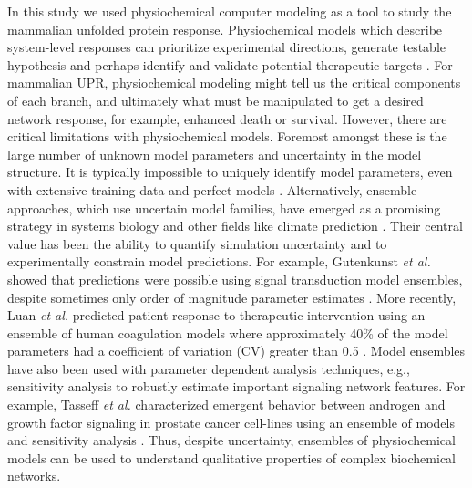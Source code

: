 \documentclass[fleqn,10pt]{wlscirep}
\begin{document}
In this study we used physiochemical computer modeling as a tool to study the mammalian unfolded protein response. Physiochemical models which describe system-level responses can prioritize experimental directions, generate testable hypothesis and perhaps identify and validate potential therapeutic targets \cite{KITANO2007}. For mammalian UPR, physiochemical modeling might tell us the critical components of each branch, and ultimately what must be manipulated to get a desired network response, for example, enhanced death or survival. However, there are critical limitations with physiochemical models. Foremost amongst these is the large number of unknown model parameters and uncertainty in the model structure. It is typically impossible to uniquely identify model parameters, even with extensive training data and perfect models \cite{Gadkar:2005ad}. Alternatively, ensemble approaches, which use uncertain model families, have emerged as a promising strategy in systems biology and other fields like climate prediction \cite{Battogtokh:2002uq,Kuepfer:2007,Brown:2003qy,Palmer:2005,Song:2009uq}. Their central value has been the ability to quantify simulation uncertainty and to experimentally constrain model predictions. For example, Gutenkunst \emph{et al.} showed that predictions were possible using signal transduction model ensembles, despite sometimes only order of magnitude parameter estimates \cite{Gutenkunst:2007oq}. More recently, Luan \emph{et al.} predicted patient response to therapeutic intervention using an ensemble of human coagulation models where approximately 40\% of the model parameters had a coefficient of variation (CV) greater than 0.5 \cite{Luan:2010fc}. Model ensembles have also been used with parameter dependent analysis techniques, e.g., sensitivity analysis to robustly estimate important signaling network features. For example, Tasseff \emph{et al.} characterized emergent behavior between androgen and growth factor signaling in prostate cancer cell-lines using an ensemble of models and sensitivity analysis \cite{Tasseff:2010rq}. Thus, despite uncertainty, ensembles of physiochemical models can be used to understand qualitative properties of complex biochemical networks. 
\end{document}
